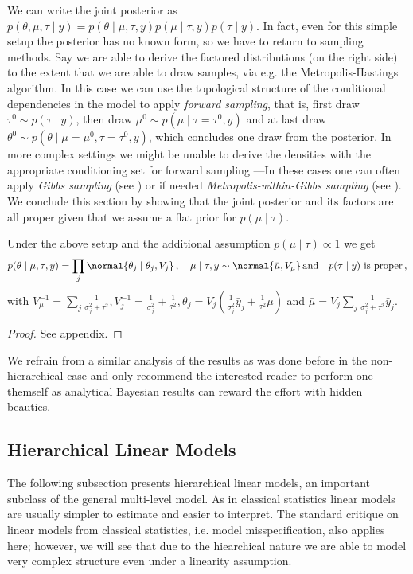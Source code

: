 We can write the joint posterior as $p(\theta, \mu, \tau \mid y) = p(\theta \mid \mu, \tau, y) p(\mu \mid \tau, y) p(\tau \mid y)$.
In fact, even for this simple setup the posterior has no known form, so we have to return to sampling methods.
Say we are able to derive the factored distributions (on the right side) to the extent that we are able to draw samples, via e.g. the Metropolis-Hastings algorithm.
In this case we can use the topological structure of the conditional dependencies in the model to apply \emph{forward sampling}, that is, first draw $\tau^0 \sim p(\tau \mid y)$, then draw $\mu^0 \sim p(\mu \mid \tau=\tau^0, y)$ and at last draw $\theta^0 \sim p(\theta \mid \mu=\mu^0, \tau=\tau^0, y)$, which concludes one draw from the posterior.
In more complex settings we might be unable to derive the densities with the appropriate conditioning set for forward sampling ---In these cases one can often apply \emph{Gibbs sampling} (see \citet{geman1984}) or if needed \emph{Metropolis-within-Gibbs sampling} (see \citet{gilks1995}).
We conclude this section by showing that the joint posterior and its factors are all proper given that we assume a flat prior for $p(\mu \mid \tau)$.

\begin{proposition}
    Under the above setup and the additional assumption $p(\mu \mid \tau) \propto 1$ we get
    \begin{align}
      p(\theta \mid \mu, \tau, y) =  \prod_j \normal{\theta_j \mid \bar{\theta}_j, V_j} \,,  \quad
      \mu \mid \tau, y \sim \normal{\bar{\mu}, V_\mu}\,\text{and} \quad
      p(\tau \mid y) \,\, \text{is proper} \,,
    \end{align}
    with $V_\mu^{-1} = \sum_j \frac{1}{\sigma_j^2 + \tau^2}, V_j^{-1}=\frac{1}{\sigma_j^2} + \frac{1}{\tau^2}, \bar{\theta}_j=V_j(\frac{1}{\sigma_j^2} \bar{y}_j + \frac{1}{\tau^2}\mu)$ and $\bar{\mu} = V_j \sum_j \frac{1}{\sigma_j^2 + \tau^2} \bar{y}_j$.
\end{proposition}
\begin{proof}
See appendix.
\end{proof}

We refrain from a similar analysis of the results as was done before in the non-hierarchical case and only recommend the interested reader to perform one themself as analytical Bayesian results can reward the effort with hidden beauties.

\subsection{Hierarchical Linear Models}
The following subsection presents hierarchical linear models, an important subclass of the general multi-level model.
As in classical statistics linear models are usually simpler to estimate and easier to interpret.
The standard critique on linear models from classical statistics, i.e. model misspecification, also applies here; however, we will see that due to the hiearchical nature we are able to model very complex structure even under a linearity assumption.

